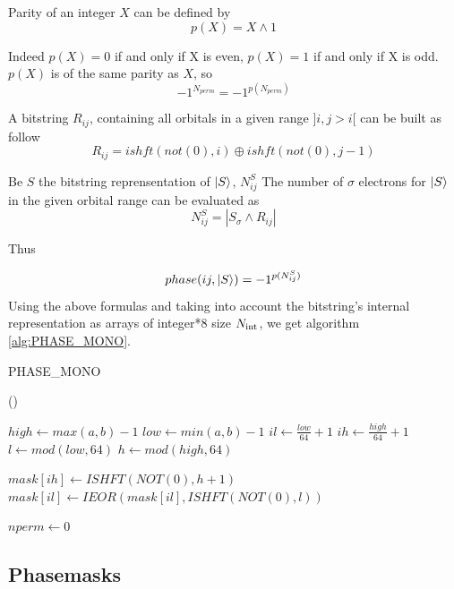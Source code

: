 Parity of an integer $X$ can be defined by $$p(X)=X \wedge 1$$
        
Indeed $p(X)=0$ if and only if X is even, $p(X)=1$ if and only if X is odd. $p(X)$ is of the same parity as $X$, so 
$$-1^{N_{perm}} = -1^{p(N_{perm})}$$
        
        

A bitstring $R_{ij}$, containing all orbitals in a given range $]i, j>i[$ can be built as follow
$$R_{ij}=ishft(not(0),i) \oplus ishft(not(0),j-1)$$


Be $S$ the bitstring reprensentation of $\ket S$, $N^{S}_{ij}$ The number of $\sigma$ electrons for $\ket S$ in the given orbital range can be evaluated as
$$N^{S}_{ij} = |S_\sigma \wedge R_{ij}|$$

Thus 

$$phase(ij, \ket S) = -1^{p(N^S_{ij})}$$
Using the above formulas and taking into account the bitstring's internal representation as arrays of integer*8 size ${N_\text{int}}$, we get algorithm \ref{alg:PHASE_MONO}.   


\begin{algorithm}
	\caption{PHASE\_MONO}	
	\label{alg:PHASE_MONO}
	
	\Fn(){}{
		$high \gets max(a,b)-1$ \;
		$low \gets min(a,b)-1$ \;
		$il \gets \frac{low}{64} + 1$ \;
		$ih \gets \frac{high}{64} + 1$ \;
		$l \gets mod(low, 64)$ \;
		$h \gets mod(high, 64)$ \; 

		
		$mask[ih] \gets ISHFT(NOT(0), h+1)$ \;
		$mask[il] \gets IEOR(mask[il], ISHFT(NOT(0), l))$ \;
		
		
		$nperm \gets 0$ \;
		}
\end{algorithm}
        

\subsection{Phasemasks}


